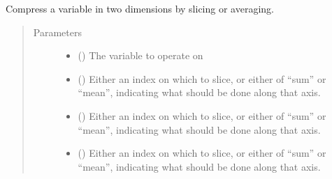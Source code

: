 \documentclass[letterpaper,10pt,english]{sphinxmanual}
\begin{document}

\begin{fulllineitems}
\label{\detokenize{source/exoplasim:exoplasim.gcmt.make2d}}
Compress a variable in two dimensions by slicing or averaging.
\begin{quote}\begin{description}
\item[{Parameters}] \leavevmode\begin{itemize}
\item {} 
 () \textendash{} The variable to operate on

\item {} 
 (\sphinxstyleliteralemphasis{\sphinxupquote{, }}\sphinxstyleliteralemphasis{\sphinxupquote{, }}) \textendash{} Either an index on which to slice, or either of “sum” or “mean”, indicating what
should be done along that axis.

\item {} 
 (\sphinxstyleliteralemphasis{\sphinxupquote{, }}\sphinxstyleliteralemphasis{\sphinxupquote{, }}) \textendash{} Either an index on which to slice, or either of “sum” or “mean”, indicating what
should be done along that axis.

\item {} 
 (\sphinxstyleliteralemphasis{\sphinxupquote{, }}\sphinxstyleliteralemphasis{\sphinxupquote{, }}) \textendash{} Either an index on which to slice, or either of “sum” or “mean”, indicating what
should be done along that axis.


\end{itemize}
\end{description}
\end{quote}
\end{fulllineitems}
\end{document}
